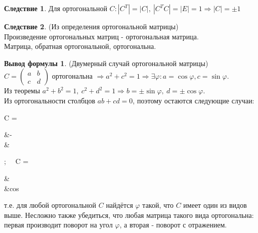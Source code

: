 \documentclass[a4paper, 12pt]{article}
\renewcommand{\phi}{\varphi}
\theoremstyle{definition}
\newtheorem*{consequense}{Следствие}
\newtheorem*{formula}{Вывод формулы}
\newenvironment{boxedalign*}
  {\begin{equation*}\begin{lrbox}{\boxedalignbox}$\begin{aligned}}
  {\end{aligned}$\end{lrbox}\fbox{\usebox{\boxedalignbox}}\end{equation*}}
\begin{document}
	\begin{consequense}
		Для ортогональной $C: |C^T| = |C|, \ |C^T C| = |E| = 1 \Rightarrow |C| = \pm 1$
	\end{consequense}
	\begin{consequense}(Из определения ортогональной матрицы)\\
		Произведение ортогональных матриц - ортогональная матрица.\\
		Матрица, обратная ортогональной, ортогональна.
	\end{consequense}
	\begin{formula}(Двумерный случай ортогональной матрицы)\\
		$C = \begin{pmatrix} a&b\\c&d \end{pmatrix}$ ортогональна $\Rightarrow a^2 + c^2 = 1 \Rightarrow \exists \phi: a = \cos\phi, c = \sin\phi$.\\
		Из теоремы $a^2 + b^2 = 1, \ c^2 + d^2 = 1 \Rightarrow b = \pm\sin\phi, \ d = \pm\cos\phi$.\\
		Из ортогональности столбцов $ab + cd = 0$, поэтому остаются следующие случаи: \begin{boxedalign*}C = \begin{pmatrix} \cos\phi&-\sin\phi\\\sin\phi&\cos\phi\end{pmatrix}; \ \ C = \begin{pmatrix} \cos\phi&\sin\phi\\\sin\phi&\-cos\phi\end{pmatrix}\end{boxedalign*}
		т.е. для любой ортогональной $C$ найдётся $\phi$ такой, что $C$ имеет один из видов выше. Несложно также убедиться, что любая матрица такого вида ортогональна: первая производит поворот на угол $\phi$, а вторая - поворот с отражением.
	\end{formula}
\end{document}
